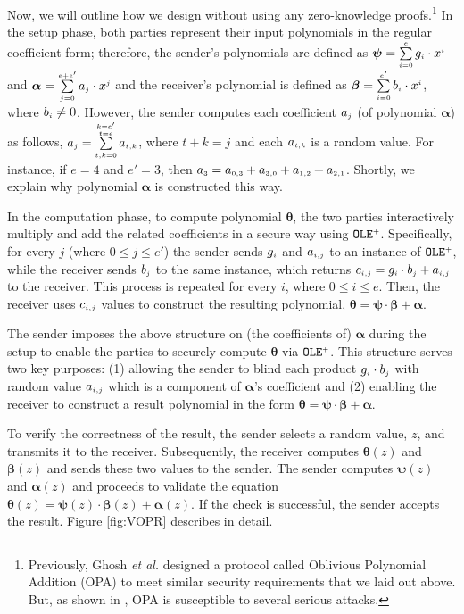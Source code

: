 Now, we will outline how we design \vopr without using any zero-knowledge proofs.\footnote{Previously, Ghosh \textit{et al.}  \cite{GhoshN19} designed a protocol called Oblivious Polynomial Addition (OPA) to meet similar security requirements that we laid out above. But, as shown in \cite{AbadiMZ21}, OPA  is susceptible to several serious attacks. } In the setup phase, both parties represent their input polynomials in the regular coefficient form; therefore, the sender's polynomials are defined as $\bm\psi=\sum\limits^{\scriptscriptstyle e}_{\scriptscriptstyle i=0}g_{\scriptscriptstyle i}\cdot x^{\scriptscriptstyle i}$ and  $\bm\alpha=\sum\limits^{\scriptscriptstyle e+e'}_{\scriptscriptstyle j=0}a_{\scriptscriptstyle j}\cdot x^{\scriptscriptstyle j}$ and the receiver's polynomial is defined as $\bm\beta=\sum\limits^{\scriptscriptstyle e'}_{\scriptscriptstyle i=0}b_{\scriptscriptstyle i}\cdot x^{\scriptscriptstyle i}$, where $b_{\scriptscriptstyle i}\neq 0$. However, the sender computes each coefficient $a_{\scriptscriptstyle j}$ (of polynomial $\bm \alpha$) as follows,  $a_{\scriptscriptstyle j}=\sum\limits^{\substack{\scriptscriptstyle k=e'\\ \scriptscriptstyle t=e}}_{\scriptscriptstyle t,k=0} a_{\scriptscriptstyle t,k}$,  where  $t+k=j$ and each $a_{\scriptscriptstyle t,k}$ is a random value. For instance, if $e=4$ and $e'=3$, then $a_{\scriptscriptstyle 3}=a_{\scriptscriptstyle \scriptscriptstyle 0,3}+a_{\scriptscriptstyle 3,0}+a_{\scriptscriptstyle 1,2}+a_{\scriptscriptstyle 2,1}$. Shortly, we explain why polynomial $\bm\alpha$ is constructed this way. 



In the computation phase,  to compute polynomial $\bm\theta$, the two parties interactively multiply and add the related coefficients in a secure way using $\mathtt{OLE}^{\scriptscriptstyle +}$. Specifically,
%
%
for every $j$  (where $0\leq j\leq e'$) the sender sends $g_{\scriptscriptstyle i}$ and $a_{\scriptscriptstyle i,j}$ to an instance of  $\mathtt{OLE}^{\scriptscriptstyle +}$, while the receiver sends $b_{\scriptscriptstyle j}$ to the same instance,  which returns $c_{\scriptscriptstyle i,j}=g_{\scriptscriptstyle i}\cdot b_{\scriptscriptstyle j}+ a_{\scriptscriptstyle i,j}$ to the receiver. This process is repeated for every $i$, where $0 \leq i \leq e$. Then, the receiver uses $c_{\scriptscriptstyle i,j}$ values to construct the resulting polynomial, $\bm\theta=\bm\psi\cdot \bm\beta+\bm\alpha$.  

The sender imposes the above structure on (the coefficients of)  $\bm\alpha$ during the setup to enable the parties to securely compute $\bm\theta$ via  $\mathtt{OLE}^{\scriptscriptstyle +}$.  This structure serves two key purposes: (1) allowing the sender  to blind each product $g_{\scriptscriptstyle i}\cdot b_{\scriptscriptstyle j}$  with  random value $a_{\scriptscriptstyle i,j}$ which is a component of $\bm\alpha$'s coefficient and (2) enabling the receiver to construct a result polynomial in the form $\bm\theta=\bm\psi\cdot \bm\beta+\bm\alpha$. 


To verify the correctness of the result, the sender selects a random value, $z$, and transmits it to the receiver.   Subsequently, the receiver computes  $\bm\theta(z)$ and $\bm\beta(z)$ and sends these two values  to the sender. The sender computes  $\bm\psi(z)$ and $\bm\alpha(z)$ and proceeds to validate the equation $\bm\theta({ z})=\bm\psi({ z})\cdot \bm\beta({ z})+\bm\alpha({ z})$. If the check is successful, the sender accepts the result. Figure \ref{fig:VOPR} describes \vopr in detail. 


